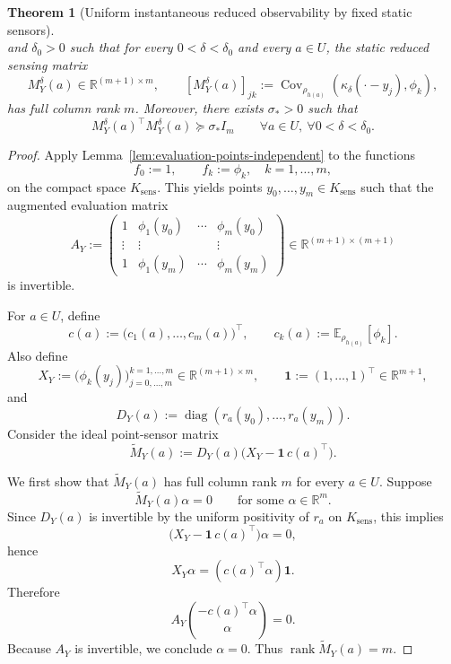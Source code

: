 \documentclass{article}
\newtheorem{theorem}{Theorem}[section]
\theoremstyle{definition}
\begin{document}
\begin{theorem}[Uniform instantaneous reduced observability by fixed static sensors]
\[    \]
    and \(\delta_0>0\) such that for every \(0<\delta<\delta_0\) and every \(a\in U\), the static
    reduced sensing matrix
    \[
        M_Y^\delta(a)\in\mathbb R^{(m+1)\times m},
        \qquad
        [M_Y^\delta(a)]_{jk}
        :=
        \operatorname{Cov}_{\rho_{h(a)}}(\kappa_\delta(\cdot-y_j),\phi_k),
    \]
    has full column rank \(m\). Moreover, there exists \(\sigma_*>0\) such that
    \begin{equation}
        \label{eq:uniform-static-gramian-lower-bound}
        M_Y^\delta(a)^\top M_Y^\delta(a)\succeq \sigma_* I_m
        \qquad
        \forall a\in U,\ \forall 0<\delta<\delta_0.
    \end{equation}
\end{theorem}

\begin{proof}
    Apply Lemma~\ref{lem:evaluation-points-independent} to the functions
    \[
        f_0:=1,\qquad f_k:=\phi_k,\quad k=1,\dots,m,
    \]
    on the compact space \(K_{\mathrm{sens}}\). This yields points \(y_0,\dots,y_m\in K_{\mathrm{sens}}\)
    such that the augmented evaluation matrix
    \[
        A_Y
        :=
        \begin{pmatrix}
            1      & \phi_1(y_0) & \cdots & \phi_m(y_0) \\
            \vdots & \vdots      &        & \vdots      \\
            1      & \phi_1(y_m) & \cdots & \phi_m(y_m)
        \end{pmatrix}
        \in\mathbb R^{(m+1)\times(m+1)}
    \]
    is invertible.

    For \(a\in U\), define
    \[
        c(a):=
        \bigl(c_1(a),\dots,c_m(a)\bigr)^\top,
        \qquad
        c_k(a):=\mathbb E_{\rho_{h(a)}}[\phi_k].
    \]
    Also define
    \[
        X_Y:=\bigl(\phi_k(y_j)\bigr)_{j=0,\dots,m}^{k=1,\dots,m}\in\mathbb R^{(m+1)\times m},
        \qquad
        \mathbf 1:=(1,\dots,1)^\top\in\mathbb R^{m+1},
    \]
    and
    \[
        D_Y(a):=\operatorname{diag}(r_a(y_0),\dots,r_a(y_m)).
    \]
    Consider the ideal point-sensor matrix
    \[
        \widetilde M_Y(a):=D_Y(a)\bigl(X_Y-\mathbf 1\,c(a)^\top\bigr).
    \]

    We first show that \(\widetilde M_Y(a)\) has full column rank \(m\) for every \(a\in U\).
    Suppose
    \[
        \widetilde M_Y(a)\alpha=0
        \qquad\text{for some }\alpha\in\mathbb R^m.
    \]
    Since \(D_Y(a)\) is invertible by the uniform positivity of \(r_a\) on \(K_{\mathrm{sens}}\), this implies
    \[
        \bigl(X_Y-\mathbf 1\,c(a)^\top\bigr)\alpha=0,
    \]
    hence
    \[
        X_Y\alpha=(c(a)^\top\alpha)\mathbf 1.
    \]
    Therefore
    \[
        A_Y
        \binom{-c(a)^\top\alpha}{\alpha}
        =
        0.
    \]
    Because \(A_Y\) is invertible, we conclude \(\alpha=0\). Thus
    \(\operatorname{rank}\widetilde M_Y(a)=m\).


\end{proof}
\end{document}
